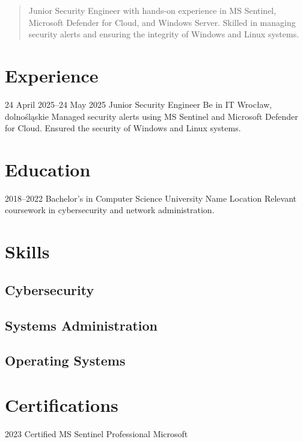 




\address{City, Country}


\begin{quote}
Junior Security Engineer with hands-on experience in MS Sentinel, Microsoft Defender for Cloud, and Windows Server. Skilled in managing security alerts and ensuring the integrity of Windows and Linux systems.
\end{quote}

\section{Experience}

\begin{entrylist}
\entry
  {24 April 2025--24 May 2025}
  {Junior Security Engineer}
  {Be in IT}
  {Wrocław, dolnośląskie}
  {Managed security alerts using MS Sentinel and Microsoft Defender for Cloud. Ensured the security of Windows and Linux systems.}
\end{entrylist}


\section{Education}

\begin{entrylist}
\entry
  {2018--2022}
  {Bachelor's in Computer Science}
  {University Name}
  {Location}
  {Relevant coursework in cybersecurity and network administration.}
\end{entrylist}


\section{Skills}

\subsection{Cybersecurity}

\subsection{Systems Administration}

\subsection{Operating Systems}


\section{Certifications}

\begin{entrylist}
\entry
  {2023}
  {Certified MS Sentinel Professional}
  {Microsoft}
  {}
  {}
\end{entrylist}



